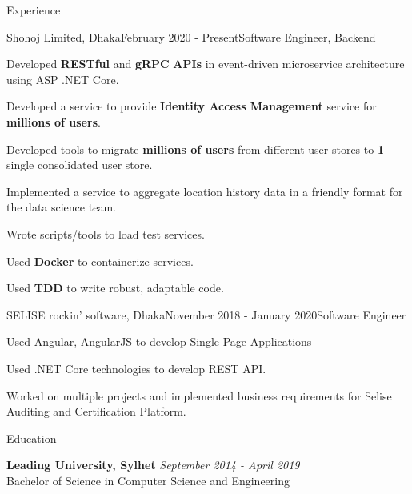 \documentclass{resume}
\begin{document}
\begin{rSection}{Experience}

\begin{rSubsection}{Shohoj Limited, Dhaka}{February 2020 - Present}{Software Engineer, Backend}{}

\item Developed \textbf{RESTful} and \textbf{gRPC} \textbf{APIs} in event-driven microservice architecture  using  ASP .NET Core.
\item Developed a service to provide \textbf{Identity Access Management} service for \textbf{millions of users}.
\item Developed tools to migrate \textbf{millions of users} from different user stores to \textbf{1} single consolidated user store.
\item Implemented a service to aggregate location history data in a friendly format for the data science team.
\item Wrote scripts/tools to load test services.
\item Used \textbf{Docker} to containerize services.
\item Used \textbf{TDD} to write robust, adaptable code.
\end{rSubsection}

\begin{rSubsection}{SELISE rockin' software, Dhaka}{November 2018 - January 2020}{Software Engineer}{}
\item Used Angular, AngularJS to develop Single Page Applications
\item Used .NET Core technologies to develop REST API.
\item Worked on multiple projects and implemented business requirements for Selise Auditing and Certification Platform.
\end{rSubsection}

\end{rSection}


\begin{rSection}{Education}

{\bf Leading University, Sylhet} \hfill {\em September 2014 - April 2019}
\\ Bachelor of Science in Computer Science and Engineering
\end{rSection}
\end{document}
